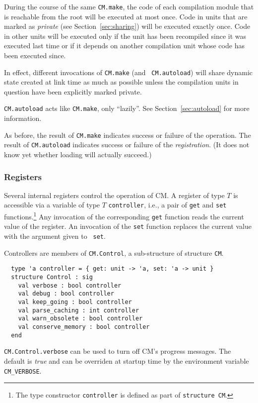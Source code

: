 \documentclass[titlepage,letterpaper]{article}
\begin{document}
During the course of the same {\tt CM.make}, the code of each
compilation module that is reachable from the root will be executed at
most once.  Code in units that are marked as {\it private} (see
Section~\ref{sec:sharing}) will be executed exactly once.  Code in
other units will be executed only if the unit has been recompiled
since it was executed last time or if it depends on another
compilation unit whose code has been executed since.

In effect, different invocations of {\tt CM.make} (and {\tt
CM.autoload}) will share dynamic state created at link time as much as
possible unless the compilation units in question have been explicitly
marked private.

{\tt CM.autoload} acts like {\tt CM.make}, only ``lazily''. See
Section~\ref{sec:autoload} for more information.

As before, the result of {\tt CM.make} indicates success or failure of
the operation.  The result of {\tt CM.autoload} indicates success or
failure of the {\em registration}.  (It does not know yet whether
loading will actually succeed.)

\subsubsection*{Registers}

Several internal registers control the operation of CM.  A register of
type $T$ is accessible via a variable of type $T$ {\tt controller},
i.e., a pair of {\tt get} and {\tt set} functions.\footnote{The type
constructor {\tt controller} is defined as part of {\tt structure
CM}.}  Any invocation of the corresponding {\tt get} function reads
the current value of the register.  An invocation of the {\tt set}
function replaces the current value with the argument given to {\tt
set}.

Controllers are members of {\tt CM.Control}, a sub-structure of
structure {\tt CM}.

\begin{verbatim}
  type 'a controller = { get: unit -> 'a, set: 'a -> unit }
  structure Control : sig
    val verbose : bool controller
    val debug : bool controller
    val keep_going : bool controller
    val parse_caching : int controller
    val warn_obsolete : bool controller
    val conserve_memory : bool controller
  end
\end{verbatim}

{\tt CM.Control.verbose} can be used to turn off CM's progress
messages.  The default is {\em true} and can be overriden at startup
time by the environment variable {\tt CM\_VERBOSE}.
\end{document}
